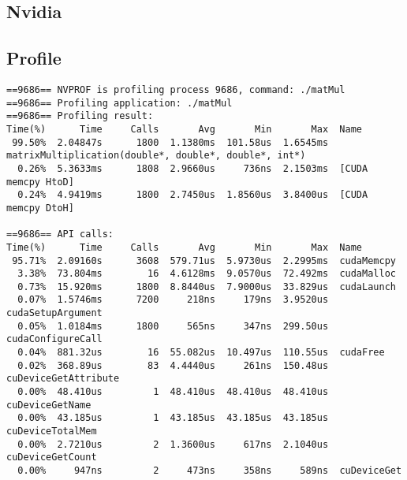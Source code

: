 \documentclass[7pt]{article}
\begin{document}
\subsection{Nvidia}
\subsection{Profile}
\begin{verbatim}
==9686== NVPROF is profiling process 9686, command: ./matMul
==9686== Profiling application: ./matMul
==9686== Profiling result:
Time(%)      Time     Calls       Avg       Min       Max  Name
 99.50%  2.04847s      1800  1.1380ms  101.58us  1.6545ms  matrixMultiplication(double*, double*, double*, int*)
  0.26%  5.3633ms      1808  2.9660us     736ns  2.1503ms  [CUDA memcpy HtoD]
  0.24%  4.9419ms      1800  2.7450us  1.8560us  3.8400us  [CUDA memcpy DtoH]

==9686== API calls:
Time(%)      Time     Calls       Avg       Min       Max  Name
 95.71%  2.09160s      3608  579.71us  5.9730us  2.2995ms  cudaMemcpy
  3.38%  73.804ms        16  4.6128ms  9.0570us  72.492ms  cudaMalloc
  0.73%  15.920ms      1800  8.8440us  7.9000us  33.829us  cudaLaunch
  0.07%  1.5746ms      7200     218ns     179ns  3.9520us  cudaSetupArgument
  0.05%  1.0184ms      1800     565ns     347ns  299.50us  cudaConfigureCall
  0.04%  881.32us        16  55.082us  10.497us  110.55us  cudaFree
  0.02%  368.89us        83  4.4440us     261ns  150.48us  cuDeviceGetAttribute
  0.00%  48.410us         1  48.410us  48.410us  48.410us  cuDeviceGetName
  0.00%  43.185us         1  43.185us  43.185us  43.185us  cuDeviceTotalMem
  0.00%  2.7210us         2  1.3600us     617ns  2.1040us  cuDeviceGetCount
  0.00%     947ns         2     473ns     358ns     589ns  cuDeviceGet

\end{verbatim}
\end{document}
